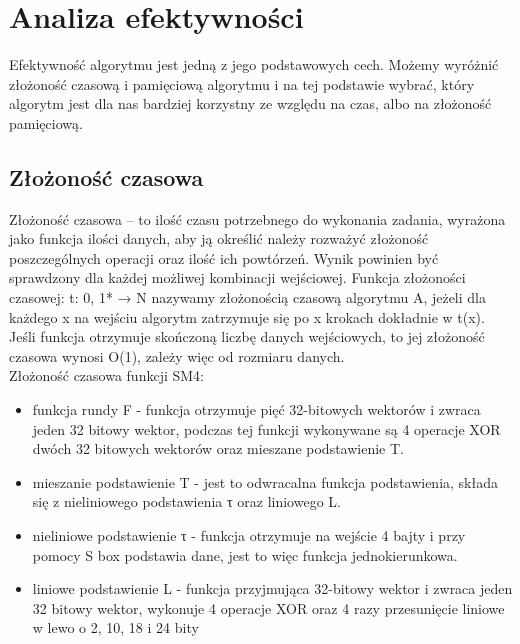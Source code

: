 \section{Analiza efektywności}

Efektywność algorytmu jest jedną z jego podstawowych cech. Możemy wyróżnić złożoność czasową i pamięciową algorytmu i na tej podstawie wybrać, który algorytm jest dla nas bardziej korzystny ze względu na czas, albo na złożoność pamięciową.\\

\subsection{ Złożoność czasowa}
Złożoność czasowa – to ilość czasu potrzebnego do wykonania zadania, wyrażona jako funkcja ilości danych, aby ją określić należy rozważyć złożoność poszczególnych operacji oraz ilość ich powtórzeń. Wynik powinien być sprawdzony dla każdej możliwej kombinacji wejściowej. Funkcja złożoności czasowej: t: {0, 1}* → N nazywamy złożonością czasową algorytmu A, jeżeli dla każdego x na wejściu algorytm zatrzymuje się po x krokach dokładnie w t(x). Jeśli funkcja otrzymuje skończoną liczbę danych wejściowych, to jej złożoność czasowa wynosi O(1), zależy więc od rozmiaru danych.\\

Złożoność czasowa funkcji SM4:
\begin{itemize}
    \item funkcja rundy F -  funkcja otrzymuje pięć 32-bitowych wektorów i zwraca jeden 32 bitowy wektor, podczas tej funkcji wykonywane są 4 operacje XOR dwóch 32 bitowych wektorów oraz mieszane podstawienie T.
    \item mieszanie podstawienie T - jest to odwracalna funkcja podstawienia, składa się z nieliniowego podstawienia τ oraz liniowego L.
    \item nieliniowe podstawienie τ - funkcja otrzymuje na wejście 4 bajty i przy pomocy S box podstawia dane, jest to więc funkcja jednokierunkowa.
    \item liniowe podstawienie L - funkcja przyjmująca 32-bitowy wektor i zwraca jeden 32 bitowy wektor, wykonuje 4 operacje XOR oraz 4 razy przesunięcie liniowe w lewo o 2, 10, 18 i 24 bity\\

\end{itemize}\\\\


